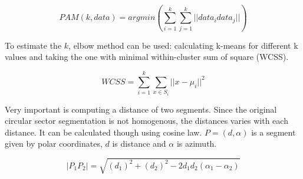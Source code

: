 \begin{equation}
\mathit{PAM}(k, data) = argmin \left( \sum_{i=1}^{k} \sum_{j=1}^{k} ||data_{i} data_{j}||  \right)
\end{equation}



To estimate the $k$, elbow method can be used: calculating k-means for different k values and taking the one with
minimal within-cluster sum of square (WCSS).\cite{ClusterAnalysis} \cite{VagueNatureInformation}

\begin{equation}
\mathit{WCSS} = \sum_{i=1}^{k} \sum_{x \in S_i} ||x - \mu_i||^2
\end{equation}

Very important is computing a distance of two segments. Since the original circular sector segmentation
is not homogenous, the distances varies with each distance. It can be calculated though using
cosine law. $P = (d, \alpha)$ is a segment given by polar coordinates, $d$ is distance and $\alpha$ is
azimuth.

\begin{equation}
|P_{1} P_{2}| = \sqrt{(d_{1})^{2} + (d_{2})^{2} - 2d_{1}d_{2}(\alpha_1 - \alpha_2)}
\end{equation}




